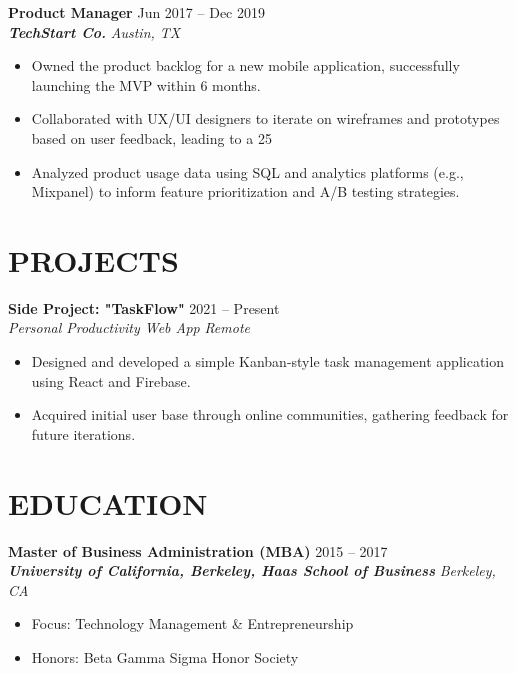 \documentclass[9pt, letterpaper]{article} %
\newcommand{\entry}[4]{%
    \vspace{0.5ex}
    \textbf{#1} \hfill {\small\color{dates} #4} \\ %
    \textit{#2} \hfill \textit{\small\color{dates} #3} %
}
\begin{document}
\entry{Product Manager}
      {\textbf{TechStart Co.}}
      {Austin, TX}
      {Jun 2017 -- Dec 2019}
\begin{itemize}
    \item Owned the product backlog for a new mobile application, successfully launching the MVP within 6 months.
    \item Collaborated with UX/UI designers to iterate on wireframes and prototypes based on user feedback, leading to a 25%
    \item Analyzed product usage data using SQL and analytics platforms (e.g., Mixpanel) to inform feature prioritization and A/B testing strategies.
\end{itemize}



\section{PROJECTS} %

\entry{Side Project: "TaskFlow"}
      {Personal Productivity Web App}
      {Remote}
      {2021 -- Present}
\begin{itemize}
    \item Designed and developed a simple Kanban-style task management application using React and Firebase.
    \item Acquired initial user base through online communities, gathering feedback for future iterations.
\end{itemize}


\section{EDUCATION}

\entry{Master of Business Administration (MBA)}
      {\textbf{University of California, Berkeley, Haas School of Business}}
      {Berkeley, CA}
      {2015 -- 2017}
\begin{itemize}
   \item Focus: Technology Management \& Entrepreneurship
   \item Honors: Beta Gamma Sigma Honor Society
\end{itemize}
\end{document}
